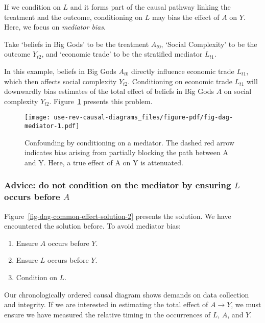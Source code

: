 \documentclass[
  singlecolumn,
  9pt]{article}
\providecommand{\tightlist}{%
  \setlength{\itemsep}{0pt}\setlength{\parskip}{0pt}}\usepackage{longtable,booktabs,array}
\begin{document}
If we condition on \(L\) and it forms part of the causal pathway linking
the treatment and the outcome, conditioning on \(L\) may bias the effect
of \(A\) on \(Y\). Here, we focus on \emph{mediator bias}.

Take `beliefs in Big Gods' to be the treatment \(A_{t0}\), `Social
Complexity' to be the outcome \(Y_{t2}\), and `economic trade' to be the
stratified mediator \(L_{t1}\).

In this example, beliefs in Big Gods \(A_{t0}\) directly influence
economic trade \(L_{t1}\), which then affects social complexity
\(Y_{t2}\). Conditioning on economic trade \(L_{t1}\) will downwardly
bias estimates of the total effect of beliefs in Big Gods \(A\) on
social complexity \(Y_{t2}\). Figure~\ref{fig-dag-mediator} presents
this problem.

\begin{figure}

{\centering \texttt{[image: use-rev-causal-diagrams\_files/figure-pdf/fig-dag-mediator-1.pdf]}

}

\caption{\label{fig-dag-mediator}Confounding by conditioning on a
mediator. The dashed red arrow indicates bias arising from partially
blocking the path between A and Y. Here, a true effect of A on Y is
attenuated.}

\end{figure}

\subsubsection{\texorpdfstring{Advice: do not condition on the mediator
by ensuring \(L\) occurs before
\(A\)}{Advice: do not condition on the mediator by ensuring L occurs before A}}\label{advice-do-not-condition-on-the-mediator-by-ensuring-l-occurs-before-a}

Figure~\ref{fig-dag-common-effect-solution-2} presents the solution. We
have encountered the solution before. To avoid mediator bias:

\begin{enumerate}
\def\labelenumi{\arabic{enumi}.}
\tightlist
\item
  Ensure \(A\) occurs before \(Y\).
\item
  Ensure \(L\) occurs before \(Y\).
\item
  Condition on \(L\).
\end{enumerate}

Our chronologically ordered causal diagram shows demands on data
collection and integrity. If we are interested in estimating the total
effect of \(A\to Y\), we must ensure we have measured the relative
timing in the occurrences of \(L\), \(A\), and \(Y\).
\end{document}
